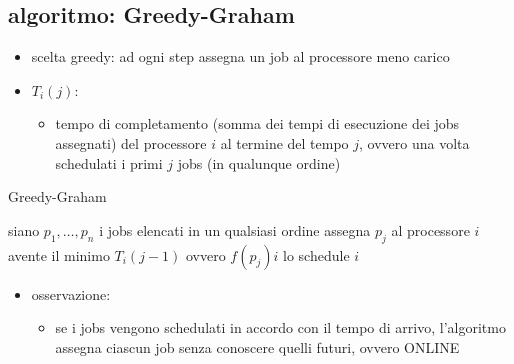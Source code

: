 
\subsection*{algoritmo: Greedy-Graham}
\begin{flushleft}
	\begin{itemize}
		\item scelta greedy: ad ogni step assegna un job al processore meno carico
		\item $T_i(j)$:
		\begin{itemize}
			\item tempo di completamento (somma dei tempi di esecuzione dei jobs assegnati) del processore $i$ al termine del tempo $j$, ovvero una volta schedulati i primi $j$ jobs (in qualunque ordine)
		\end{itemize}
	\end{itemize}
	\begin{algorithm}
		\caption{Greedy-Graham}
		\begin{algorithmic}
			\STATE siano $p_1,\ldots,p_n$ i jobs elencati in un qualsiasi ordine
				\STATE assegna $p_j$ al processore $i$ avente il minimo $T_i(j-1)$ ovvero $f(p_j)i$
			\ENDFOR
			\RETURN lo schedule $i$
		\end{algorithmic}
	\end{algorithm}
	\begin{itemize}
		\item osservazione:
		\begin{itemize}
			\item se i jobs vengono schedulati in accordo con il tempo di arrivo, l'algoritmo assegna ciascun job senza conoscere quelli futuri, ovvero ONLINE
		\end{itemize}
	\end{itemize}
\end{flushleft}


